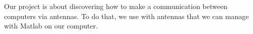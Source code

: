 Our project is about discovering how to make a communication between computers via antennas.
To do that, we use  with  antennas that we can manage with Matlab on our computer.